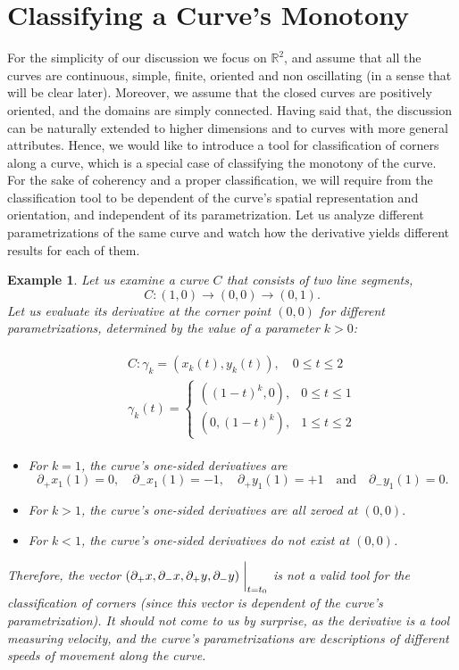 \documentclass[11pt]{book}
\newtheorem{exm}[thm]{Example}
\begin{document}
\section{Classifying a Curve's Monotony}
For the simplicity of our discussion we focus on $\mathbb{R}^2$, and assume that all the curves are continuous, simple, finite, oriented and non oscillating (in a sense that will be clear later). Moreover, we assume that the closed curves are positively oriented, and the domains are simply connected. Having said that, the discussion can be naturally extended to higher dimensions and to curves with more general attributes. Hence, we would like to introduce a tool for classification of corners along a curve, which is a special case of classifying the monotony of the curve. For the sake of coherency and a proper classification, we will require from the classification tool to be dependent of the curve’s spatial representation and orientation, and independent of its parametrization. Let us analyze different parametrizations of the same curve and watch how the derivative yields different results for each of them.

\begin{exm}Let us examine a curve $C$ that consists of two line segments, $$C: \left(1,0\right)\longrightarrow\left(0,0\right)\longrightarrow\left(0,1\right).$$Let us evaluate its derivative at the corner point $\left(0,0\right)$ for different parametrizations, determined by the value of a parameter $k >0$:

\begin{align}
&\begin{aligned}
 & C:\gamma_{k}=\left(x_{k}\left(t\right),y_{k}\left(t\right)\right),\quad0\leq t\leq2\\
 & \gamma_{k}\left(t\right)=\begin{cases}
\left(\left(1-t\right)^{k},0\right), & 0\leq t\leq1\\
\left(0,\left(1-t\right)^{k}\right), & 1\leq t\leq2
\end{cases}
\end{aligned}
\end{align}
\begin{itemize}
\item For $k=1$, the curve's one-sided derivatives are 
\[
\partial_{+}x_{1}\left(1\right)=0,\quad\partial_{-}x_{1}\left(1\right)=-1,\quad\partial_{+}y_{1}\left(1\right)=+1\quad\text{and}\quad\partial_{-}y_{1}\left(1\right)=0.
\]
\item For $k>1$, the curve's one-sided derivatives are all
zeroed at $\left(0,0\right).$
\item For $k<1$, the curve's one-sided derivatives do not
exist at $\left(0,0\right)$.
\end{itemize}
Therefore, the vector $\left(\partial_{+}x,\partial_{-}x,\partial_{+}y,\partial_{-}y\right)\biggm\lvert_{t=t_{0}}$
is not a valid tool for the classification of corners (since this vector
is dependent of the curve's parametrization). It should
not come to us by surprise, as the derivative is a tool measuring
velocity, and the curve's parametrizations are descriptions of different
speeds of movement along the curve.
\end{exm}
\end{document}
